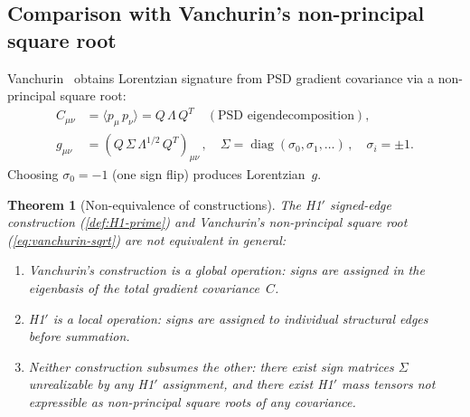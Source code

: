 \documentclass[11pt]{article}
\newtheorem{theorem}{Theorem}[section]
\theoremstyle{definition}
\theoremstyle{remark}
\begin{document}
\subsection{Comparison with Vanchurin's non-principal square root}
\label{sec:comparison-vanchurin}

Vanchurin~\cite{Vanchurin2025} obtains Lorentzian signature from PSD
gradient covariance via a non-principal square root:
\begin{align}
\label{eq:vanchurin-sqrt}
C_{\mu\nu} &= \langle p_\mu\, p_\nu \rangle = Q\,\Lambda\,Q^T
\quad (\text{PSD eigendecomposition}), \\
g_{\mu\nu} &= (Q\,\Sigma\,\Lambda^{1/2}\,Q^T)_{\mu\nu}\,,
\quad \Sigma = \operatorname{diag}(\sigma_0, \sigma_1, \ldots)\,,
\quad \sigma_i = \pm 1. \nonumber
\end{align}
Choosing $\sigma_0 = -1$ (one sign flip) produces Lorentzian~$g$.

\begin{theorem}[Non-equivalence of constructions]
\label{thm:non-equivalence}
The H1$'$ signed-edge construction (\cref{def:H1-prime}) and
Vanchurin's non-principal square root (\cref{eq:vanchurin-sqrt}) are
\emph{not equivalent} in general:
\begin{enumerate}
\item[\emph{(a)}] Vanchurin's construction is a \emph{global} operation:
  signs are assigned in the eigenbasis of the total gradient covariance~$C$.
\item[\emph{(b)}] H1$'$ is a \emph{local} operation:
  signs are assigned to individual structural edges before summation.
\item[\emph{(c)}] Neither construction subsumes the other:
  there exist sign matrices $\Sigma$ unrealizable by any H1$'$ assignment,
  and there exist H1$'$ mass tensors not expressible as non-principal
  square roots of any covariance.
\end{enumerate}
\end{theorem}
\end{document}
